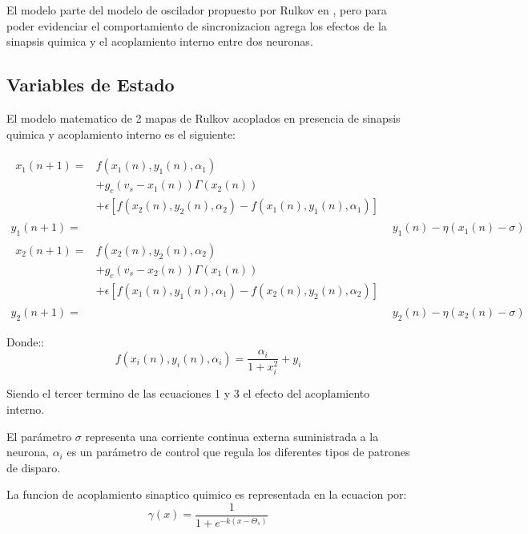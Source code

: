 \documentclass[12pt]{article}
\begin{document}
El modelo parte del modelo de oscilador propuesto por Rulkov en \cite{rulkov}, pero para poder evidenciar el comportamiento de sincronizacion agrega los efectos de la sinapsis quimica y el acoplamiento interno entre dos neuronas.

\subsection{Variables de Estado}
El modelo matematico de 2 mapas de Rulkov acoplados en presencia de sinapsis quimica y acoplamiento interno es el siguiente: 

\begin{align} \label{Rulkov_map}
\begin{split}
x_{1}(n+1) = &f(x_{1}(n),y_{1}(n),\alpha_{1}) \\
             &+ g_{c}(v_{s}-x_{1}(n))\Gamma(x_{2}(n)) \\
             &+\epsilon[f(x_{2}(n),y_{2}(n),\alpha_{2})-f(x_{1}(n),y_{1}(n),\alpha_{1})]  
\end{split}
\\
y_{1}(n+1) = &y_{1}(n)-\eta(x_{1}(n)-\sigma)
\\
\begin{split}
x_{2}(n+1) = &f(x_{2}(n),y_{2}(n),\alpha_{2}) \\
             &+ g_{c}(v_{s}-x_{2}(n))\Gamma(x_{1}(n)) \\
             &+\epsilon[f(x_{1}(n),y_{1}(n),\alpha_{1})-f(x_{2}(n),y_{2}(n),\alpha_{2})]  
\end{split}
\\
y_{2}(n+1) = &y_{2}(n)-\eta(x_{2}(n)-\sigma)
\end{align}

Donde:: 
\begin{equation*}
f(x_{i}(n),y_{i}(n),\alpha_{i}) = \frac{\alpha_{i}}{1+x_{i}^{2}}+y_{i}
\end{equation*}

Siendo el tercer termino de las ecuaciones 1 y 3 el efecto del acoplamiento interno. 

El parámetro $\sigma$ representa una corriente continua externa suministrada a la neurona, $\alpha_{i}$ es un parámetro de control que regula los diferentes tipos de patrones de disparo. 

La funcion de acoplamiento sinaptico quimico es representada en la ecuacion por: 
\begin{equation*}
\gamma(x) = \frac{1}{1+e^{-k(x-\Theta_{s})}}
\end{equation*}
\end{document}
